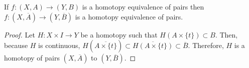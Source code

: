 \documentclass[12pt]{extarticle}
\begin{document}
\begin{lemma} \label{hom_pairs}
If $f : (X, A) \to (Y, B)$ is a homotopy equivalence of pairs then $f : (X, \overline{A}) \to (Y, \overline{B})$ is a homotopy equivalence of pairs.
\end{lemma}

\begin{proof}
Let $H : X \times I \to Y$ be a homotopy such that $H(A \times \{ t \} ) \subset B$. Then, because $H$ is continuous, $H( \overline{A \times \{t\}} ) \subset \overline{H(A \times \{t\})} \subset \overline{B}$. Therefore, $H$ is a homotopy of pairs $(X, \overline{A})$ to $(Y, \overline{B})$.  
\end{proof}
\end{document}
